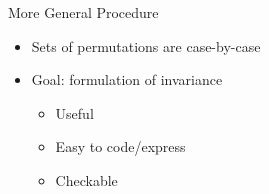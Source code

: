 \documentclass[usenames,dvipsnames]{beamer}
\newcommand{\e}{\emptyset}
\begin{document}
% 
% 

\begin{frame}[fragile]{More General Procedure}
  \begin{itemize}
    \item Sets of permutations are case-by-case
    \item Goal: formulation of invariance
    \begin{itemize}
      \item Useful
      \item Easy to code/express
      \item Checkable
    \end{itemize}
  \end{itemize}

\end{frame}
\end{document}
